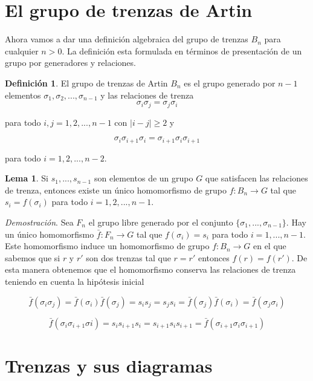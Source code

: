 \documentclass[12pt]{article}
\theoremstyle{definition}
\newtheorem{defi}{Definición}[section]
\newtheorem{lema}{Lema}[section]
\begin{document}
\section{El grupo de trenzas de Artin}

Ahora vamos a dar una definición algebraica del grupo de trenzas $B_n$ para cualquier $n>0$. La definición esta formulada en términos de presentación de un grupo por generadores y relaciones.

\begin{defi}
El grupo de trenzas de Artin $B_n$ es el grupo generado por $n-1$ elementos $\sigma_1, \sigma_2,...,\sigma_{n-1}$ y las relaciones de trenza
$$\sigma_i\sigma_j = \sigma_j\sigma_i$$

para todo $i,j=1,2,...,n-1$ con $|i-j|\geq 2$ y

$$\sigma_i\sigma_{i+1}\sigma_i =\sigma_{i+1}\sigma_i\sigma_{i+1}$$

para todo $i=1,2,...,n-2$.
\label{defi:artin}
\end{defi}

\begin{lema}
Si $s_1,...,s_{n-1}$ son elementos de un grupo $G$ que satisfacen las relaciones de trenza, entonces existe un único homomorfismo de grupo $f:B_n\rightarrow G$ tal que $s_i = f(\sigma_i)$ para todo $i=1,2,...,n-1$.
\label{uni_homo}
\end{lema}

\textit{Demostración}. Sea $F_n$ el grupo libre generado por el conjunto $\{\sigma_1,...,\sigma_{n-1}\}$. Hay un único homomorfismo $\bar{f}:F_n\rightarrow G$ tal que $f(\sigma_i)= s_i$ para todo $i=1,...,n-1$. Este homomorfismo induce un homomorfismo de grupo $f:B_n\rightarrow G$ en el que sabemos que si $r$ y $r'$ son dos trenzas tal que $r = r'$ entonces $f(r) = f(r')$. De esta manera obtenemos que el homomorfismo conserva las relaciones de trenza teniendo en cuenta la hipótesis inicial

$$\bar{f}(\sigma_i\sigma_{j})=\bar{f}(\sigma_i)\bar{f}(\sigma_{j})=s_is_j=s_js_i=\bar{f}(\sigma_j)\bar{f}(\sigma_{i})=\bar{f}(\sigma_j\sigma_{i})$$

$$\bar{f}(\sigma_i\sigma_{i+1}\sigma{i}) = s_is_{i+1}s_i=s_{i+1}s_is_{i+1} = \bar{f}(\sigma_{i+1}\sigma_i\sigma_{i+1})$$





\section{Trenzas y sus diagramas}
\end{document}
